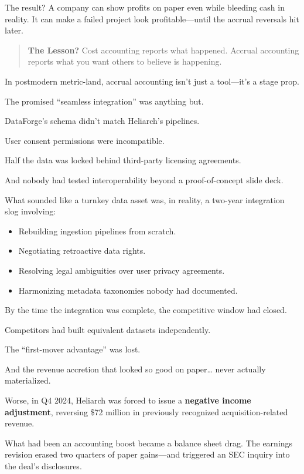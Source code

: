 \begin{tcolorbox}[colback=blue!5!white, colframe=blue!50!black, breakable,
  title={Historical Sidebar: Counting the Same Money Twice — Cost Accounting vs. Accrual Accounting}]
\medskip

The result?  
A company can show profits on paper even while bleeding cash in reality.  
It can make a failed project look profitable—until the accrual reversals hit later.

\begin{quote}
\textbf{The Lesson?} Cost accounting reports what happened. Accrual accounting reports what you want others to believe is happening.
\end{quote}

In postmodern metric-land, accrual accounting isn’t just a tool—it’s a stage prop.

\end{tcolorbox}


The promised “seamless integration” was anything but.  

DataForge’s schema didn’t match Heliarch’s pipelines.  

User consent permissions were incompatible.  

Half the data was locked behind third-party licensing agreements.  

And nobody had tested interoperability beyond a proof-of-concept slide deck.

What sounded like a turnkey data asset was, in reality, a two-year integration slog involving:

\begin{itemize}
  \item Rebuilding ingestion pipelines from scratch.
  \item Negotiating retroactive data rights.
  \item Resolving legal ambiguities over user privacy agreements.
  \item Harmonizing metadata taxonomies nobody had documented.
\end{itemize}

By the time the integration was complete, the competitive window had closed.  

Competitors had built equivalent datasets independently.  

The “first-mover advantage” was lost.  

And the revenue accretion that looked so good on paper… never actually materialized.

Worse, in Q4 2024, Heliarch was forced to issue a \textbf{negative income adjustment}, reversing \$72 million in previously recognized acquisition-related revenue.  

What had been an accounting boost became a balance sheet drag.  The earnings revision erased two quarters of paper gains—and triggered an SEC inquiry into the deal’s disclosures.

